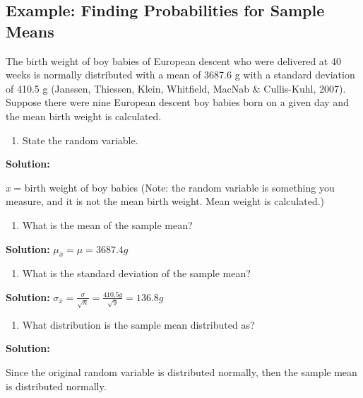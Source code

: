 \documentclass[
]{book}
\providecommand{\tightlist}{%
  \setlength{\itemsep}{0pt}\setlength{\parskip}{0pt}}
\begin{document}
\hypertarget{example-finding-probabilities-for-sample-means}{%
\subsection{Example: Finding Probabilities for Sample Means}\label{example-finding-probabilities-for-sample-means}}

The birth weight of boy babies of European descent who were delivered at 40 weeks is normally distributed with a mean of 3687.6 g with a standard deviation of 410.5 g (Janssen, Thiessen, Klein, Whitfield, MacNab \& Cullis-Kuhl, 2007). Suppose there were nine European descent boy babies born on a given day and the mean birth weight is calculated.

\begin{enumerate}
\def\labelenumi{\alph{enumi}.}
\tightlist
\item
  State the random variable.
\end{enumerate}

\textbf{Solution:}

\emph{x} = birth weight of boy babies (Note: the random variable is something you measure, and it is not the mean birth weight. Mean weight is calculated.)

\begin{enumerate}
\def\labelenumi{\alph{enumi}.}
\setcounter{enumi}{1}
\tightlist
\item
  What is the mean of the sample mean?
\end{enumerate}

\textbf{Solution:}
\(\mu_{\bar{x}}=\mu=3687.4g\)

\begin{enumerate}
\def\labelenumi{\alph{enumi}.}
\setcounter{enumi}{2}
\tightlist
\item
  What is the standard deviation of the sample mean?
\end{enumerate}

\textbf{Solution:}
\(\sigma_{\bar{x}}=\frac{\sigma}{\sqrt{n}}=\frac{410.5g}{\sqrt{9}}=136.8g\)

\begin{enumerate}
\def\labelenumi{\alph{enumi}.}
\setcounter{enumi}{3}
\tightlist
\item
  What distribution is the sample mean distributed as?
\end{enumerate}

\textbf{Solution:}

Since the original random variable is distributed normally, then the sample mean is distributed normally.
\end{document}
